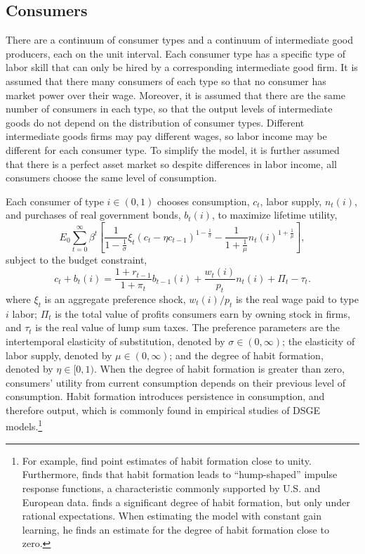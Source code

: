 \documentclass[12pt]{article}
\newcommand{\beq}{\begin{equation}}
\newcommand{\eeq}{\end{equation}}
\newcommand{\citee}[1]{\citet{#1}}
\begin{document}
\subsection{Consumers}
There are a continuum of consumer types and a continuum of intermediate good producers, each on the unit interval.  Each consumer type has a specific type of labor skill that can only be hired by a corresponding intermediate good firm.  It is assumed that there many consumers of each type so that no consumer has market power over their wage.  Moreover, it is assumed that there are the same number of consumers in each type, so that the output levels of intermediate goods do not depend on the distribution of consumer types.  Different intermediate goods firms may pay different wages, so labor income may be different for each consumer type.  To simplify the model, it is further assumed that there is a perfect asset market so despite differences in labor income, all consumers choose the same level of consumption.

Each consumer of type $i\in(0,1)$ chooses consumption, $c_t$, labor supply, $n_t(i)$, and purchases of real government bonds, $b_{t}(i)$, to maximize lifetime utility,
\beq \label{eq:util} E_0 \sum_{t=0}^{\infty} \beta^t \left[ \frac{1}{1-\frac{1}{\sigma}} \xi_t \left(c_t - \eta c_{t-1}\right)^{1-\frac{1}{\sigma}} - \frac{1}{1+\frac{1}{\mu}} n_t(i)^{1+\frac{1}{\mu}} \right], \eeq
subject to the budget constraint, 
\beq \label{eq:bc} c_t + b_t(i) = \frac{1+r_{t-1}}{1+\pi_t} b_{t-1}(i) + \frac{w_t(i)}{p_t} n_t(i) + \Pi_t - \tau_t. \eeq
where $\xi_t$ is an aggregate preference shock, $w_t(i)/p_t$ is the real wage paid to type $i$ labor; $\Pi_t$ is the total value of profits consumers earn by owning stock in firms, and $\tau_t$ is the real value of lump sum taxes.  The preference parameters are the intertemporal elasticity of substitution, denoted by $\sigma \in (0,\infty)$; the elasticity of labor supply, denoted by $\mu \in (0, \infty)$; and the degree of habit formation, denoted by $\eta \in [0,1)$.  When the degree of habit formation is greater than zero, consumers' utility from current consumption depends on their previous level of consumption.  Habit formation introduces persistence in consumption, and therefore output, which is commonly found in empirical studies of DSGE models.\footnote{For example, \citee{smetswouters2005} find point estimates of habit formation close to unity.  Furthermore, \citee{fuhrer2000} finds that habit formation leads to ``hump-shaped'' impulse response functions, a characteristic commonly supported by U.S. and European data.  \citee{milani2007} finds a significant degree of habit formation, but only under rational expectations.  When estimating the model with constant gain learning, he finds an estimate for the degree of habit formation close to zero.}   
\end{document}
